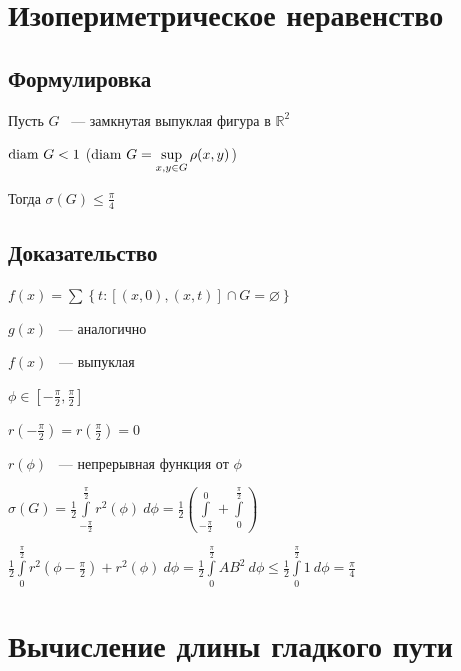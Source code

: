 \documentclass{article}
\begin{document}
    \newpage
    
    \section{Изопериметрическое неравенство}
    
        \subsection{Формулировка}
        
            Пусть $G$ ~--- замкнутая выпуклая фигура в $\mathbb{R}^2$
            
            $\diam G < 1$ ($\diam G = \sup\limits_{x, y \in G} \rho(x, y)$)
            
            Тогда $\sigma(G) \leq \frac{\pi}{4}$
            
        \subsection{Доказательство}
        
            $f(x) = \sum \left\{ t : [(x, 0), (x, t)] \cap G = \varnothing \right\}$
            
            $g(x)$ ~--- аналогично
            
            $f(x)$ ~--- выпуклая
            
            $\phi \in \left[ -\frac{\pi}{2}, \frac{\pi}{2} \right]$
            
            $r(-\frac{\pi}{2}) = r(\frac{\pi}{2}) = 0$
            
            $r(\phi)$ ~--- непрерывная функция от $\phi$
            
            $\sigma(G) = \frac{1}{2} \int\limits^{\frac{\pi}{2}}_{-\frac{\pi}{2}} r^2 (\phi) \ d \phi = \frac{1}{2} \left( \int\limits^0_{-\frac{\pi}{2}} + \int\limits^{\frac{\pi}{2}}_0 \right)$
            
            $\frac{1}{2} \int\limits^{\frac{\pi}{2}}_0 r^2 (\phi - \frac{\pi}{2}) + r^2 (\phi) \ d \phi = \frac{1}{2} \int\limits^{\frac{\pi}{2}}_0 AB^2 \ d \phi \leq \frac{1}{2} \int\limits^{\frac{\pi}{2}}_0 1 \ d \phi = \frac{\pi}{4}$
            
    \newpage
    
    \section{Вычисление длины гладкого пути}
    
\end{document}
